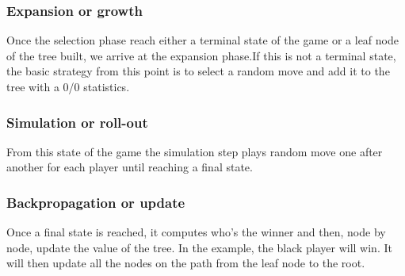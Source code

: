 \begin{center}
\end{center}
\subsubsection{Expansion or growth}
Once the selection phase reach either a terminal state of the game or a leaf node of the tree built, we arrive at the expansion phase.If this is not a terminal state, the basic strategy from this point is to select a random move and add it to the tree with a 0/0 statistics. 

\begin{center}
\end{center}

\subsubsection{Simulation or roll-out}

From this state of the game the simulation step plays random move one after another for each player until reaching a final state. 

\subsubsection{Backpropagation or update}
Once a final state is reached, it computes who's the winner and then, node by node, update the value of the tree. In the example, the black player will win. It will then update all the nodes on the path from the leaf node to the root. 

